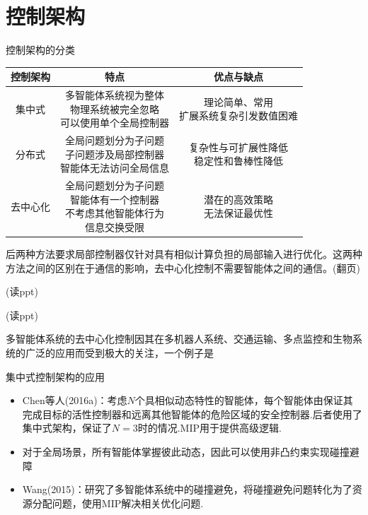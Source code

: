 \documentclass[notheorems,11pt]{beamer}
\theoremstyle{plain}
\numberwithin{theorem}{section}
\numberwithin{lemma}{section}
\numberwithin{corollary}{section}
\theoremstyle{example}
\begin{document}
\section{控制架构}
\begin{frame}{控制架构的分类}
  \centering
  \begin{tabular}{|c|c|c|}
    \hline
    控制架构 & 特点 & 优点与缺点  \\
    \hline
    集中式 & \makecell[c]{多智能体系统视为整体\\物理系统被完全忽略\\可以使用单个全局控制器} & \makecell{理论简单、常用\\扩展系统复杂引发数值困难}\\ 
    \hline
    分布式 & \makecell[c]{全局问题划分为子问题\\子问题涉及局部控制器\\智能体无法访问全局信息} & \makecell{复杂性与可扩展性降低\\稳定性和鲁棒性降低}\\
    \hline
    去中心化 & \makecell[c]{全局问题划分为子问题\\智能体有一个控制器\\不考虑其他智能体行为\\信息交换受限} & \makecell{潜在的高效策略\\无法保证最优性}\\
    \hline
  \end{tabular}
\end{frame}

\begin{frame}
  后两种方法要求局部控制器仅针对具有相似计算负担的局部输入进行优化。这两种方法之间的区别在于通信的影响，去中心化控制不需要智能体之间的通信。(翻页) \par \vspace{1 em}
  (读ppt) \par \vspace{1 em}
  (读ppt) \par \vspace{1 em}
  多智能体系统的去中心化控制因其在多机器人系统、交通运输、多点监控和生物系统的广泛的应用而受到极大的关注，一个例子是
\end{frame}

\begin{frame}{集中式控制架构的应用}
  \begin{itemize}
    \item Chen等人(2016a)：考虑$N$个具相似动态特性的智能体，每个智能体由保证其完成目标的活性控制器和远离其他智能体的危险区域的安全控制器.后者使用了集中式架构，保证了$N=3$时的情况.MIP用于提供高级逻辑.
    \item 对于全局场景，所有智能体掌握彼此动态，因此可以使用非凸约束实现碰撞避障
    \item Wang(2015)：研究了多智能体系统中的碰撞避免，将碰撞避免问题转化为了资源分配问题，使用MIP解决相关优化问题.
  \end{itemize}
\end{frame}
\end{document}

